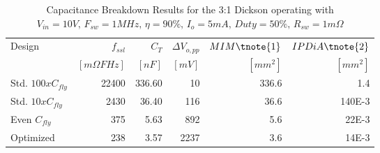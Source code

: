 \begin{table}[!h]
    \renewcommand{\arraystretch}{1.3}
    \begin{threeparttable}
    \centering
    \caption{Capacitance Breakdown Results for the 3:1 Dickson operating with
             $V_{in} = 10V, \,  F_{sw} = 1MHz, \, \eta=90\%, \, I_o =5mA , \, Duty = 50\% ,\, R_{sw}=1m \Omega$  }
    \label{tab:scc_results_II}
    \begin{tabular}{ l | r | r | r || r | r  }
      Design              &  $f_{ssl}$        & $C_T$  & $\Delta V_{o,pp}$  & $ MIM\tnote{1} $  & $IPDiA \tnote{2}$  \\
                          &  $[m\Omega F Hz]$ & $[nF]$ &     $[mV]$       & $[mm^2]$            & $[mm^2]$  \\
                          \hline \hline
      Std. $100 x C_{fly}$  &  22400   &  336.60     &   10       & 336.6 &   1.4    \\ \hline
      Std. $10 x C_{fly}$   &  2430    &   36.40     &   116      & 36.6  &   140E-3 \\ \hline
      Even $C_{fly}$        &  375     &    5.63     &   892      &  5.6  &   22E-3  \\ \hline
      Optimized             &  238     &    3.57     &   2237     &  3.6  &   14E-3

    \end{tabular}
    \end{threeparttable}
\end{table}


